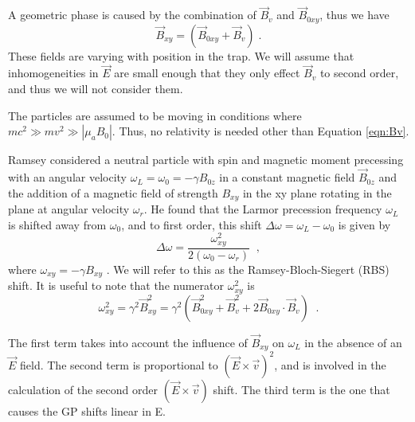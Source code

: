 A geometric phase is caused by the combination of $\vec{B}_v$ and
$\vec{B}_{0xy}$, thus we have
%
\begin{equation}
\vec{B}_{xy} = (\vec{B}_{0xy} + \vec{B}_v) \; .
\end{equation}
%
These fields are varying with position in the trap.  We will assume
that inhomogeneities in $\vec{E}$ are small enough that they only
effect $\vec{B}_v$ to second order, and thus we will not consider
them.

The particles are assumed to be moving in conditions where
$m c^2 \gg m v^2 \gg |\mu_a B_0|$.  Thus, no relativity is needed
other than Equation \ref{eqn:Bv}.


%
%
%



Ramsey considered a neutral particle with spin and magnetic moment
precessing with an angular velocity
$\omega_L = \omega_0 = -\gamma B_{0z}$ in a constant magnetic field
$\vec{B}_{0z}$ and the addition of a magnetic field of strength
$B_{xy}$ in the xy plane rotating in the plane at angular velocity
$\omega_r$.  He found that the Larmor precession frequency $\omega_L$
is shifted away from $\omega_0$, and to first order, this shift
$\Delta \omega = \omega_L - \omega_0$ is given by
%
\begin{equation}
\Delta \omega = \frac{\omega_{xy}^2}{2(\omega_0 - \omega_r)} \;\; ,
\end{equation}
%
where $\omega_{xy}  = -\gamma B_{xy}$  \cite{ramsey1955resonance}.  We
will refer  to this  as the Ramsey-Bloch-Siegert  (RBS) shift.   It is
useful to note that the numerator $\omega_{xy}^2$ is
%
\begin{equation}
\omega_{xy}^2 = \gamma^2 \vec{B}_{xy}^2 =\gamma^2(\vec{B}_{0xy}^2 + \vec{B}_{v}^2 + 2 \vec{B}_{0xy}\cdot\vec{B}_{v}) \;\; .
\end{equation}

The first term takes into account the influence of $\vec{B}_{xy}$ on
$\omega_L$ in the absence of an $\vec{E}$ field.  The second term is
proportional to $(\vec{E}\times\vec{v})^2$, and is involved in the
calculation of the second order $(\vec{E}\times\vec{v})$ shift.  The
third term is the one that causes the GP shifts linear in E.

